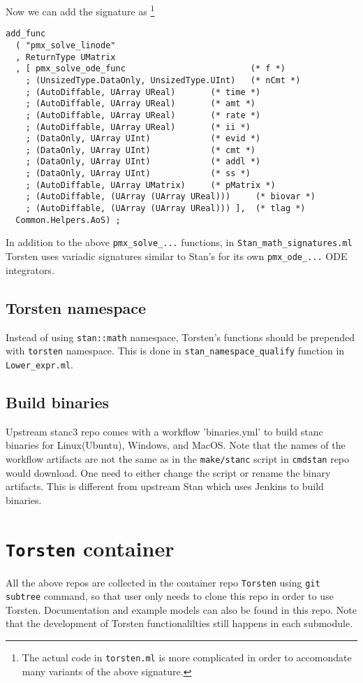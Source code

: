\documentclass[12pt, reqno, oneside]{amsbook}
\numberwithin{equation}{chapter}
\numberwithin{figure}{chapter}
\numberwithin{table}{chapter}
\theoremstyle{remark}
\begin{document}
Now we can add the signature as \footnote{The actual code in \texttt{torsten.ml} is more complicated in order to
accomondate many variants of the above signature.}
\begin{verbatim}
add_func
  ( "pmx_solve_linode"
  , ReturnType UMatrix
  , [ pmx_solve_ode_func                         (* f *)
    ; (UnsizedType.DataOnly, UnsizedType.UInt)   (* nCmt *)
    ; (AutoDiffable, UArray UReal)       (* time *)
    ; (AutoDiffable, UArray UReal)       (* amt *)
    ; (AutoDiffable, UArray UReal)       (* rate *)
    ; (AutoDiffable, UArray UReal)       (* ii *)
    ; (DataOnly, UArray UInt)            (* evid *)
    ; (DataOnly, UArray UInt)            (* cmt *)
    ; (DataOnly, UArray UInt)            (* addl *)
    ; (DataOnly, UArray UInt)            (* ss *)
    ; (AutoDiffable, UArray UMatrix)     (* pMatrix *)
    ; (AutoDiffable, (UArray (UArray UReal)))     (* biovar *)
    ; (AutoDiffable, (UArray (UArray UReal))) ],  (* tlag *)
  Common.Helpers.AoS) ;
\end{verbatim}

In addition to the above \texttt{pmx\_solve\_...} functions, in \texttt{Stan\_math\_signatures.ml} Torsten uses variadic signatures similar to Stan's for its own \texttt{pmx\_ode\_...} ODE integrators.

\section{Torsten namespace}
Instead of using \texttt{stan::math} namespace, Torsten's functions should be prepended with \texttt{torsten} namespace. This is done in \texttt{stan\_namespace\_qualify} function in \texttt{Lower\_expr.ml}.

\section{Build binaries}
Upstream stanc3 repo comes with a workflow 'binaries.yml' to build stanc binaries for Linux(Ubuntu), Windows, and MacOS. Note that the names of the workflow artifacts are not the same as in the \texttt{make/stanc} script in \texttt{cmdstan} repo would download. One need to either change the script or rename the binary artifacts. This is different from upstream Stan which uses Jenkins to build binaries.

\chapter{\texttt{Torsten} container}
\label{sec:orgd59585c}
All the above repos are collected in the container repo
\texttt{Torsten} using \texttt{git subtree} command, so that user only needs to
clone this repo in order to use Torsten. Documentation and example
models can also be found in this repo. Note that the development of
Torsten functionalilties still happens in each submodule.
\end{document}
